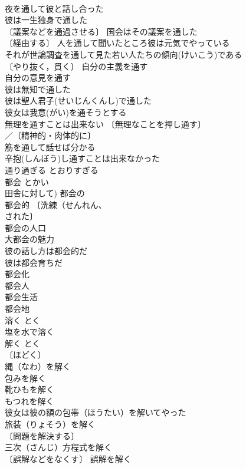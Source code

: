 \documentclass[8pt]{extreport}
\begin{document}
\begin{CJK}{UTF8}{min}
\\	夜を通して彼と話し合った 
\\	彼は一生独身で通した 
\\	〔議案などを通過させる〕 国会はその議案を通した 
\\	〔経由する〕 人を通して聞いたところ彼は元気でやっている 
\\	それが世論調査を通して見た若い人たちの傾向(けいこう)である 
\\	〔やり抜く，貫く〕 自分の主義を通す 
\\	自分の意見を通す 
\\	彼は無知で通した 
\\	彼は聖人君子(せいじんくんし)で通した 
\\	彼女は我意(がい)を通そうとする 
\\	無理を通すことは出来ない 〔無理なことを押し通す〕
\\	／〔精神的・肉体的に〕
\\	筋を通して話せば分かる 
\\	辛抱(しんぼう)し通すことは出来なかった 
\\	通り過ぎる	とおりすぎる	
\\	都会	とかい	
\\	田舎に対して) 都会の 
\\	都会的 〔洗練（せんれん、　
\\	された〕
\\	都会の人口 
\\	大都会の魅力 
\\	彼の話し方は都会的だ 
\\	彼は都会育ちだ 
\\	都会化 
\\	都会人 
\\	都会生活 
\\	都会地 
\\	溶く	とく	
\\	塩を水で溶く 
\\	解く	とく	
\\	〔ほどく〕　
\\	縄（なわ）を解く 
\\	包みを解く 
\\	靴ひもを解く 
\\	もつれを解く 
\\	彼女は彼の額の包帯（ほうたい）を解いてやった 
\\	旅装（りょそう）を解く 
\\	〔問題を解決する〕
\\	三次（さんじ）方程式を解く 
\\	〔誤解などをなくす〕 誤解を解く 

\end{CJK}
\end{document}
